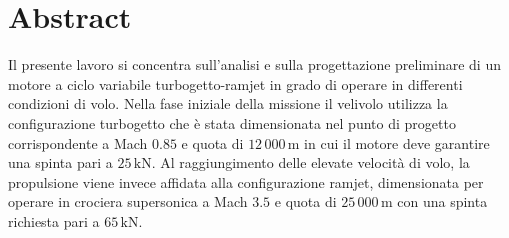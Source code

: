 \documentclass{Configuration_Files/PoliMi3i_thesis}
\begin{document}


\pagestyle{empty} %
\frontmatter %


\startpreamble
\setcounter{page}{1} %

\chapter*{Abstract} 


Il presente lavoro si concentra sull’analisi e sulla progettazione preliminare di un motore a ciclo variabile turbogetto-ramjet in grado di operare in differenti condizioni di volo. Nella fase iniziale della missione il velivolo utilizza la configurazione turbogetto che è stata dimensionata nel punto di progetto corrispondente a Mach \(0.85\) e quota di \(12\,000\,\mathrm{m}\) in cui il motore deve garantire una spinta pari a \(25\,\mathrm{kN}\). Al raggiungimento delle elevate velocità di volo, la propulsione viene invece affidata alla configurazione ramjet, dimensionata per operare in crociera supersonica a Mach \(3.5\) e quota di \(25\,000\,\mathrm{m}\) con una spinta richiesta pari a \(65\,\mathrm{kN}\).
\end{document}
